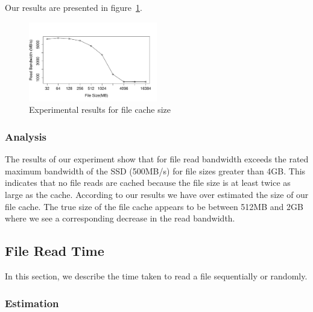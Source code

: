 Our results are presented in figure~\ref{figure:cacheresult}.

\begin{figure}
    \centering
    \includegraphics[width=0.5\textwidth]{cache-results.pdf}
    \caption{Experimental results for file cache size}
    \label{figure:cacheresult}
\end{figure}

\subsubsection{Analysis}

The results of our experiment show that for file read bandwidth exceeds the rated maximum bandwidth of the SSD (500MB/s) for file sizes greater than 4GB. This indicates that no file reads are cached because 
the file size is at least twice as large as the cache. According to our results we have over estimated the size of our file cache. The true size of the file cache appears to be between 512MB and 2GB where we 
see a corresponding decrease in the read bandwidth. 

\subsection{File Read Time}

In this section, we describe the time taken to read a file sequentially or randomly.

\subsubsection{Estimation}

